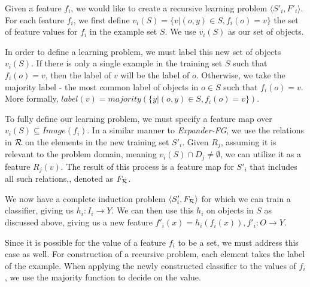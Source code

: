 \documentclass{article}
\theoremstyle{definition}
\begin{document}
Given a feature $f_{i}$, we would like to create a recursive learning problem $\langle S'_i,F'_i \rangle$. %
For each feature $f_{i}$, we first define $v_i(S) = \{v | (o,y) \in S, f_{i}(o)=v\}$ the set of feature values for $f_i$ in the example set $S$. %
We use $v_i(S)$ as our set of objects.

In order to define a learning problem, we must label this new set of objects $v_i(S)$. If there is only a single example in the training set $S$ such that $f_i(o)=v$, then the label of $v$ will be the label of $o$. Otherwise, we take the majority label - the most common label of objects in $o\in S$ such that $f_i(o)=v$. More formally, $label(v)=majority(\{y|(o,y)\in S, f_i(o)=v\})$.

To fully define our learning problem, we must specify a feature map over $v_i(S)\subseteq Image(f_i)$. In a similar manner to \emph{Expander-FG}, we use the relations in ${\cal R}$ on the elements in the new training set $S'_i$.
Given $R_j$, assuming it is relevant to the problem domain, meaning $v_i(S)\cap D_j\neq\emptyset$, we can utilize it as a feature $R_j(v)$. 
The result of this process is a feature map for $S'_i$ that includes all such relations,, denoted as $F_{\cal R}$. %

We now have a complete induction problem $\langle S'_i,F_{\cal R} \rangle$ for which we can train a classifier, giving us $h_i:I_i\rightarrow Y$. We can then use this $h_i$ on objects in $S$ as discussed above, giving us a new feature $f'_{i}(x)=h_{i}(f_{i}(x)), f'_{i}:O\rightarrow Y$. 


Since it is possible for the value of a feature $f_i$ to be a set, we must address this case as well. For construction of a recursive problem, each element takes the label of the example. When applying the newly constructed classifier to the values of $f_i$, we use the majority function to decide on the value.%
\end{document}
